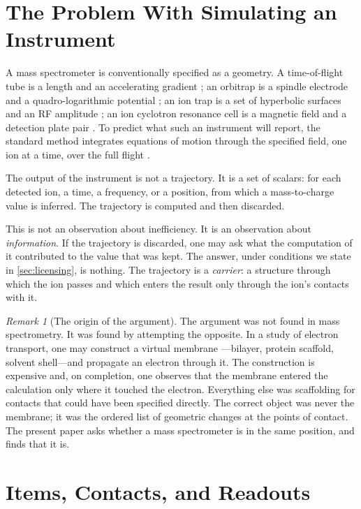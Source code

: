 \documentclass[11pt,a4paper]{article}
\theoremstyle{plain}
\theoremstyle{definition}
\theoremstyle{remark}
\newtheorem{remark}[theorem]{Remark}
\begin{document}
\section{The Problem With Simulating an Instrument}
\label{sec:problem}

A mass spectrometer is conventionally specified as a geometry. A
time-of-flight tube is a length and an accelerating gradient
\citep{wiley1955}; an orbitrap is a spindle electrode and a quadro-logarithmic
potential \citep{makarov2000}; an ion trap is a set of hyperbolic surfaces and
an RF amplitude \citep{march1997}; an ion cyclotron resonance cell is a
magnetic field and a detection plate pair \citep{comisarow1974}. To predict what
such an instrument will report, the standard method integrates equations of
motion through the specified field, one ion at a time, over the full flight
\citep{dahl2000simion}.

The output of the instrument is not a trajectory. It is a set of scalars: for
each detected ion, a time, a frequency, or a position, from which a mass-to-charge
value is inferred. The trajectory is computed and then discarded.

This is not an observation about inefficiency. It is an observation about
\emph{information}. If the trajectory is discarded, one may ask what the
computation of it contributed to the value that was kept. The answer, under
conditions we state in \cref{sec:licensing}, is nothing. The trajectory is a
\emph{carrier}: a structure through which the ion passes and which enters the
result only through the ion's contacts with it.

\begin{remark}[The origin of the argument]
\label{rem:origin}
The argument was not found in mass spectrometry. It was found by attempting the
opposite. In a study of electron transport, one may construct a virtual membrane
---bilayer, protein scaffold, solvent shell---and propagate an electron through
it. The construction is expensive and, on completion, one observes that the
membrane entered the calculation only where it touched the electron. Everything
else was scaffolding for contacts that could have been specified directly. The
correct object was never the membrane; it was the ordered list of geometric
changes at the points of contact. The present paper asks whether a mass
spectrometer is in the same position, and finds that it is.
\end{remark}

\section{Items, Contacts, and Readouts}
\label{sec:items}
\end{document}
